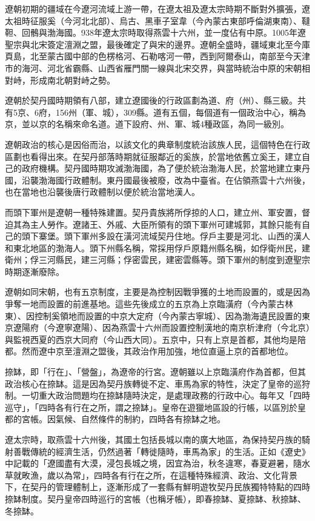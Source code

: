 遼朝初期的疆域在今遼河流域上游一帶，在遼太祖及遼太宗時期不斷對外擴張，遼太祖時征服奚（今河北北部）、烏古、黑車子室韋（今內蒙古東部呼倫湖東南）、韃靼、回鶻與渤海國。938年遼太宗時取得燕雲十六州，並一度佔有中原。1005年遼聖宗與北宋簽定澶淵之盟，最後確定了與宋的邊界。遼朝全盛時，疆域東北至今庫頁島，北至蒙古國中部的色楞格河、石勒喀河一帶，西到阿爾泰山，南部至今天津市的海河、河北省霸縣、山西省雁門關一線與北宋交界，與當時統治中原的宋朝相對峙，形成南北朝對峙之勢。

遼朝於契丹國時期領有八部，建立遼國後的行政區劃為道、府（州）、縣三級。共有5京、6府，156州（軍、城），309縣。道有五個，每個道有一個政治中心，稱為京，並以京的名稱來命名道。道下設府、州、軍、城4種政區，為同一級別。

遼朝政治的核心是因俗而治，以該文化的典章制度統治該族人民，這個特色在行政區劃也看得出來。在契丹部落時期就征服鄰近的奚族，於當地依舊立奚王，建立自己的政府機構。契丹國時期攻滅渤海國，為了便於統治渤海人民，於當地建立東丹國，沿襲渤海國行政體制。東丹國最後被廢，改為中臺省。在佔領燕雲十六州後，也在當地也沿襲後唐行政體制以便於統治當地漢人。

而頭下軍州是遼朝一種特殊建置。契丹貴族將所俘掠的人口，建立州、軍安置，督迫其為主人勞作。遼諸王、外戚、大臣所領有的頭下軍州可建城郭，其餘只能有自己的頭下寨堡。頭下軍州多設在潢河流域契丹住地。俘戶主要是河北、山西的漢人和東北地區的渤海人。頭下州縣名稱，常採用俘戶原籍州縣名稱，如俘衛州民，建衛州；俘三河縣民，建三河縣；俘密雲民，建密雲縣等。頭下軍州的制度到遼聖宗時期逐漸廢除。

遼朝如同宋朝，也有五京制度，主要是為控制因戰爭獲的土地而設置的，或是因為爭奪一地而設置的前進基地。這些先後成立的五京為上京臨潢府（今內蒙古林東）、因控制奚領地而設置的中京大定府（今內蒙古寧城）、因為渤海遺民設置的東京遼陽府（今遼寧遼陽）、因為燕雲十六州而設置控制漢地的南京析津府（今北京）與監視西夏的西京大同府（今山西大同）。五京中，只有上京是首都，其他均是陪都。然而遼中京至澶淵之盟後，其政治作用加強，地位直逼上京的首都地位。

捺缽，即「行在」、「營盤」，為遼帝的行宮。遼朝雖以上京臨潢府作為首都，但其政治核心在捺缽。這是因為契丹族轉徙不定、車馬為家的特性，決定了皇帝的巡狩制。一切重大政治問題均在捺缽隨時決定，是處理政務的行政中心。每年又「四時巡守」，「四時各有行在之所，謂之捺缽」。皇帝在遊獵地區設的行帳，以區別於皇都的宮帳。因氣候、自然條件的制約，四時各有捺缽之地。

遼太宗時，取燕雲十六州後，其國土包括長城以南的廣大地區，為保持契丹族的騎射善戰傳統的經濟生活，仍然過著「轉徙隨時，車馬為家」的生活。正如《遼史》中記載的「遼國盡有大漠，浸包長城之境，因宜為治，秋冬違寒，春夏避暑，隨水草就畋漁，歲以為常」，四時各有行在之所，在這種特殊經濟、政治、文化背景下，在契丹的管理體制上，逐漸形成了一套縣有鮮明遊牧契丹民族獨特特點的四時捺缽制度。契丹皇帝四時巡行的宮帳（也稱牙帳），即春捺缽、夏捺缽、秋捺缽、冬捺缽。


